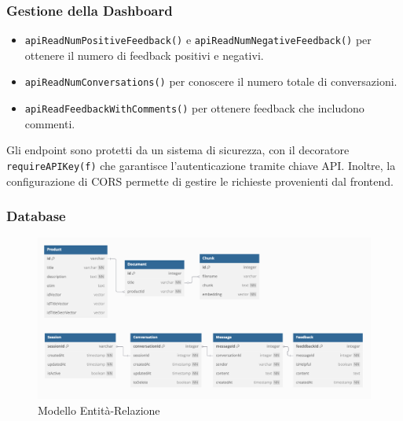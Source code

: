 \subsubsection*{Gestione della Dashboard}
\begin{itemize}
    \item \texttt{apiReadNumPositiveFeedback()} e \texttt{apiReadNumNegativeFeedback()} per ottenere il numero di feedback positivi e negativi.
    \item \texttt{apiReadNumConversations()} per conoscere il numero totale di conversazioni.
    \item \texttt{apiReadFeedbackWithComments()} per ottenere feedback che includono commenti.
\end{itemize}

Gli endpoint sono protetti da un sistema di sicurezza, con il decoratore \texttt{requireAPIKey(f)} che garantisce l’autenticazione tramite chiave API. Inoltre, la configurazione di CORS permette di gestire le richieste provenienti dal frontend.

\subsubsection{Database}
\begin{figure}[H]
    \centering
    \includegraphics[width=\textwidth]{images/DB.png}
    \caption{Modello Entit\`a-Relazione}
    \label{fig:Diagramma ER}
\end{figure}

